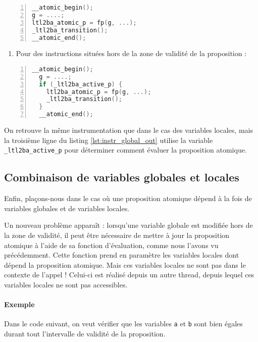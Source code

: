 \begin{lstlisting}[language=C, frame=single, numbers=left,
  caption=Instrumentation pour une variable globale dans la zone de validité]
__atomic_begin();
g = ....;
ltl2ba_atomic_p = fp(g, ...);
_ltl2ba_transition();
__atomic_end();
\end{lstlisting}

\begin{enumerate}
\def\labelenumi{\arabic{enumi})}
\setcounter{enumi}{1}
\item
  Pour des instructions situées hors de la zone de validité de la
  proposition :
\end{enumerate}

\begin{lstlisting}[language=C, frame=single, numbers=left, label=lst:instr_global_out,
  caption=Instrumentation pour une variable globale hors de la zone de validité]
  __atomic_begin();
  g = ....;
  if (_ltl2ba_active_p) {
    ltl2ba_atomic_p = fp(g, ...);
    _ltl2ba_transition();
  }
  __atomic_end();
\end{lstlisting}

On retrouve la même instrumentation que dans le cas des variables locales,
mais la troisième ligne du listing \ref{lst:instr_global_out} utilise la
variable \texttt{\_ltl2ba\_active\_p} pour déterminer comment évaluer la
proposition atomique.

\subsection{Combinaison de variables globales et locales}

Enfin, plaçons-nous dans le cas où une proposition atomique dépend à la
fois de variables globales et de variables locales.

Un nouveau problème apparaît : lorsqu'une variable globale est modifiée
hors de la zone de validité, il peut être nécessaire de mettre à jour la
proposition atomique à l'aide de sa fonction d'évaluation, comme nous
l'avons vu précédemment. Cette fonction prend en paramètre les variables
locales dont dépend la proposition atomique. Mais ces variables locales
ne sont pas dans le contexte de l'appel ! Celui-ci est réalisé depuis un
autre thread, depuis lequel ces variables locales ne sont pas
accessibles.

\paragraph{Exemple}
Dans le code suivant, on veut vérifier que les variables \texttt{a} et
\texttt{b} sont bien égales durant tout l'intervalle de validité de la
proposition.

